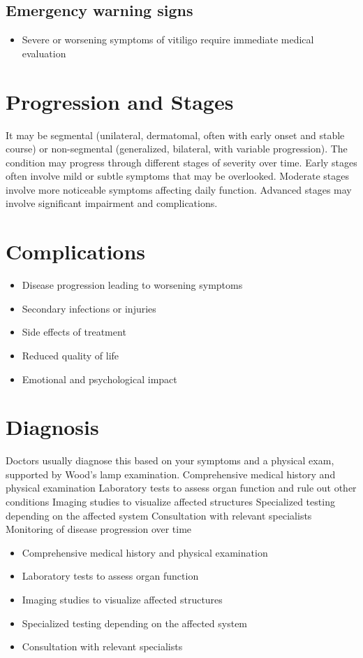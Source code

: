 \subsection{Emergency warning signs}
\begin{itemize}[noitemsep]
  \item Severe or worsening symptoms of vitiligo require immediate medical evaluation
\end{itemize}
\section{Progression and Stages}
It may be segmental (unilateral, dermatomal, often with early onset and stable course) or non-segmental (generalized, bilateral, with variable progression). The condition may progress through different stages of severity over time. Early stages often involve mild or subtle symptoms that may be overlooked. Moderate stages involve more noticeable symptoms affecting daily function. Advanced stages may involve significant impairment and complications.
\section{Complications}
\begin{itemize}[noitemsep]
  \item Disease progression leading to worsening symptoms
  \item Secondary infections or injuries
  \item Side effects of treatment
  \item Reduced quality of life
  \item Emotional and psychological impact
\end{itemize}
\section{Diagnosis}
Doctors usually diagnose this based on your symptoms and a physical exam, supported by Wood's lamp examination. Comprehensive medical history and physical examination Laboratory tests to assess organ function and rule out other conditions Imaging studies to visualize affected structures Specialized testing depending on the affected system Consultation with relevant specialists Monitoring of disease progression over time

\begin{itemize}[noitemsep]
  \item Comprehensive medical history and physical examination
  \item Laboratory tests to assess organ function
  \item Imaging studies to visualize affected structures
  \item Specialized testing depending on the affected system
  \item Consultation with relevant specialists
\end{itemize}
